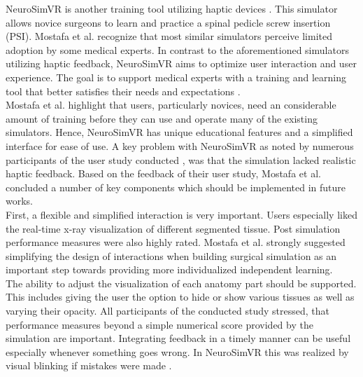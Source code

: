 NeuroSimVR is another training tool utilizing haptic devices \cite{RN71}. This simulator allows
novice surgeons to learn and practice a spinal pedicle screw insertion (PSI). Mostafa
et al. \cite{RN71} recognize that most similar simulators perceive limited adoption by some medical
experts. In contrast to the aforementioned simulators utilizing haptic feedback, NeuroSimVR aims to optimize user interaction
and user experience. The goal is to support medical experts with a training and learning
tool that better satisfies their needs and expectations \cite{RN71}.
\\ Mostafa et al. highlight that users, particularly novices, need an considerable amount
of training before they can use and operate many of the existing simulators. Hence,
NeuroSimVR has unique educational features and a simplified interface for ease of use.
A key problem with NeuroSimVR as noted by numerous participants of the user study
conducted \cite{RN71}, was that the simulation lacked realistic haptic feedback. Based on the
feedback of their user study, Mostafa et al. concluded a number of key components which should be implemented in future works.
\\ First, a flexible and simplified interaction is very important. Users especially liked the
real-time x-ray visualization of different segmented tissue. Post simulation performance
measures were also highly rated. Mostafa et al.
strongly suggested simplifying the design of interactions when building surgical simulation as an important step towards providing more individualized independent learning.
\\ The ability to adjust the visualization of each anatomy part should be supported. This
includes giving the user the option to hide or show various tissues as well as varying their
opacity. All participants of the conducted study stressed, that performance measures
beyond a simple numerical score provided by the simulation are important. Integrating
feedback in a timely manner can be useful especially whenever something goes wrong.
In NeuroSimVR this was realized by visual blinking if mistakes were made \cite{RN71}.